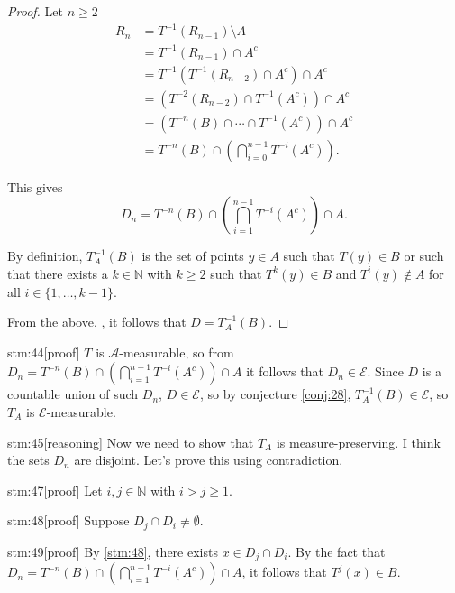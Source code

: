 \begin{proof}
Let $n \ge 2$
\begin{align*}
R_n &= T^{-1}(R_{n-1}) \setminus A \\
&= T^{-1}(R_{n-1}) \cap A^c \\
&= T^{-1}(T^{-1}(R_{n-2}) \cap A^c) \cap A^c \\
&= (T^{-2}(R_{n-2}) \cap T^{-1}(A^c)) \cap A^c \\
&= (T^{-n}(B) \cap \cdots \cap T^{-1}(A^c)) \cap A^c \\
&= T^{-n}(B) \cap \left( \bigcap_{i=0}^{n-1} T^{-i}(A^c) \right).
\end{align*}

This gives
\[
D_n = T^{-n}(B) \cap \left( \bigcap_{i=1}^{n-1} T^{-i}(A^c) \right) \cap A.
\]

By definition, $T_A^{-1}(B)$ is the set of points $y \in A$ such that $T(y) \in B$ or such that there exists a $k \in \mathbb{N}$ with $k \ge 2$ such that $T^k(y) \in B$ and $T^i(y) \notin A$ for all $i \in \{1, \ldots, k-1\}$.

From the above, , it follows that $D = T_A^{-1}(B)$.
\end{proof}

\begin{stm}{stm:44}[proof]
$T$ is $\mathcal{A}$-measurable, so from $D_n = T^{-n}(B) \cap \left( \bigcap_{i=1}^{n-1} T^{-i}(A^c) \right) \cap A$ it follows that $D_n \in \mathcal{E}$. Since $D$ is a countable union of such $D_n$, $D \in \mathcal{E}$, so by conjecture \ref{conj:28}, $T_A^{-1}(B) \in \mathcal{E}$, so $T_A$ is $\mathcal{E}$-measurable.
\end{stm}

\begin{stm}{stm:45}[reasoning]
Now we need to show that $T_A$ is measure-preserving. I think the sets $D_n$ are disjoint. Let's prove this using contradiction.
\end{stm}

\begin{stm}{stm:47}[proof]
Let $i, j \in \mathbb{N}$ with $i > j \ge 1$.
\end{stm}

\begin{stm}{stm:48}[proof]
Suppose $D_j \cap D_i \ne \emptyset$.
\end{stm}

\begin{stm}{stm:49}[proof]
By \ref{stm:48}, there exists $x \in D_j \cap D_i$. By the fact that $D_n = T^{-n}(B) \cap \left( \bigcap_{i=1}^{n-1} T^{-i}(A^c) \right) \cap A$, it follows that $T^j(x) \in B$.  
\end{stm}

